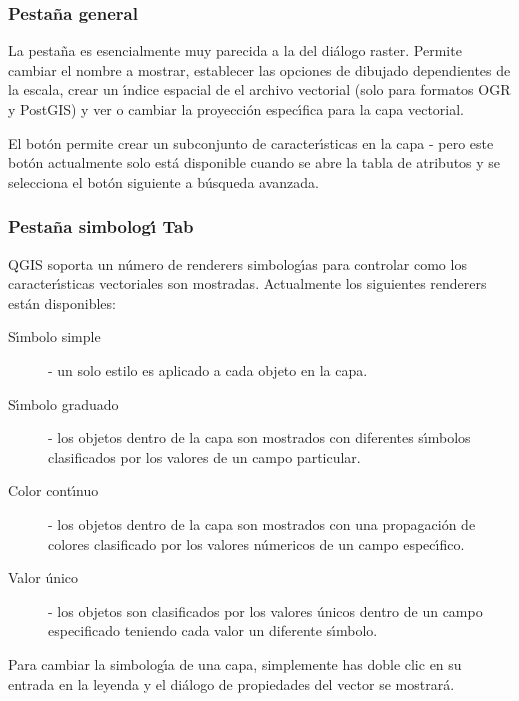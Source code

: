 \subsubsection{Pesta\~na general}\label{vectorgeneraltab}
La pesta\~na  es esencialmente muy parecida a la del di\'alogo raster. Permite
cambiar el nombre a mostrar, establecer las opciones de dibujado dependientes de la escala, crear un \'{\i}ndice espacial 
de el archivo vectorial (solo para formatos OGR y PostGIS) y ver o cambiar
la proyecci\'on espec\'{\i}fica para la capa vectorial.

El bot\'on  permite crear un subconjunto de caracter\'{\i}sticas 
en la capa - pero este bot\'on actualmente solo est\'a disponible cuando se abre la tabla  
de atributos y se selecciona el bot\'on  siguiente a b\'usqueda avanzada.

\subsubsection{Pesta\~na simbolog\'{\i} Tab}\label{sec:symbology}

QGIS soporta un n\'umero de renderers simbolog\'{\i}as para controlar como
los caracter\'{\i}sticas vectoriales son mostradas. Actualmente los siguientes renderers
est\'an disponibles:

\begin{description} 
    \item[S\'{\i}mbolo simple] - un solo estilo es aplicado a
    cada objeto en la capa.
    \item[S\'{\i}mbolo graduado] - los objetos dentro de la capa son
    mostrados con diferentes s\'{\i}mbolos clasificados por los valores de un
    campo particular. 
    \item[Color cont\'{\i}nuo] - los objetos dentro de la capa son
    mostrados con una propagaci\'on de colores clasificado por los valores
    n\'umericos de un campo espec\'{\i}fico.
    \item[Valor \'unico] - los objetos son clasificados por los valores \'unicos
    dentro de un campo especificado teniendo cada valor un diferente s\'{\i}mbolo.
\end{description}

Para cambiar la simbolog\'{\i}a de una capa, simplemente has doble clic en su entrada
en la leyenda y el di\'alogo de propiedades del vector  se mostrar\'a.

